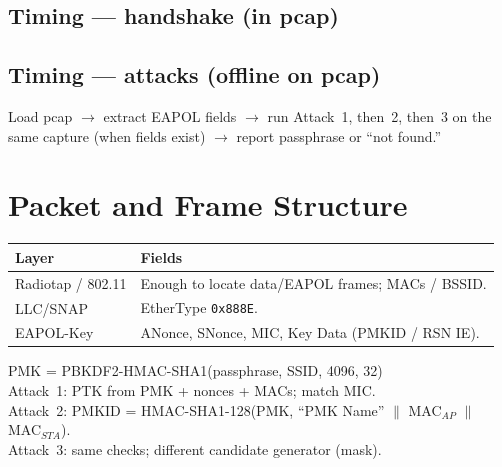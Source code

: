 \documentclass[11pt,a4paper]{article}
\begin{document}
\subsection{Timing --- handshake (in pcap)}
\begin{center}
\end{center}

\subsection{Timing --- attacks (offline on pcap)}
Load pcap $\rightarrow$ extract EAPOL fields $\rightarrow$ run Attack~1, then~2,
then~3 on the same capture (when fields exist) $\rightarrow$ report passphrase
or ``not found.''

\section{Packet and Frame Structure}

\begin{center}
\begin{tabularx}{\textwidth}{@{}l X@{}}
\toprule
\textbf{Layer} & \textbf{Fields} \\
\midrule
Radiotap / 802.11 & Enough to locate data/EAPOL frames; MACs / BSSID. \\
LLC/SNAP & EtherType \texttt{0x888E}. \\
EAPOL-Key & ANonce, SNonce, MIC, Key Data (PMKID / RSN IE). \\
\bottomrule
\end{tabularx}
\end{center}

\vspace{0.25em}
\noindent PMK = PBKDF2-HMAC-SHA1(passphrase, SSID, 4096, 32)\\
Attack~1: PTK from PMK + nonces + MACs; match MIC.\\
Attack~2: PMKID = HMAC-SHA1-128(PMK, ``PMK Name'' $\|$ MAC$_{AP}$ $\|$ MAC$_{STA}$).\\
Attack~3: same checks; different candidate generator (mask).
\end{document}
